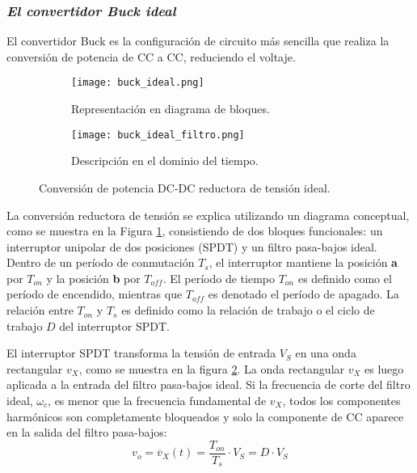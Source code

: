 \subsubsection*{\it{El convertidor Buck ideal}}
\vspace{-0.25cm}
El convertidor Buck es la configuración de circuito más sencilla que realiza la conversión de potencia de CC a CC, reduciendo el voltaje.

\begin{figure}[H]
    \centering

    \begin{subfigure}[b]{\textwidth}
        \centering
        \texttt{[image: buck\_ideal.png]}
        \vspace{-0.25cm}
        \caption{Representación en diagrama de bloques.}
        \label{fig:buck_ideal_diagrama}
    \end{subfigure}
    \begin{subfigure}[b]{\textwidth}
        \centering
        \texttt{[image: buck\_ideal\_filtro.png]}
        \vspace{-0.25cm}
        \caption{Descripción en el dominio del tiempo.}
        \label{fig:buck_ideal_filtro}
    \end{subfigure}

    \vspace{-0.25cm}
    \caption{Conversión de potencia DC-DC reductora de tensión ideal.}
    \label{fig:buck_ideal}
\end{figure}
\vspace{-0.5cm}

La conversión reductora de tensión se explica utilizando un diagrama conceptual, como se muestra en la Figura \ref{fig:buck_ideal_diagrama}, consistiendo
de dos bloques funcionales: un interruptor unipolar de dos posiciones (SPDT) y un filtro pasa-bajos ideal. Dentro de un período de conmutación $T_s$, el
interruptor mantiene la posición \textbf{a} por $T_{on}$ y la posición \textbf{b} por $T_{off}$. El período de tiempo $T_{on}$ es definido como el período de encendido,
mientras que $T_{off}$ es denotado el período de apagado. La relación entre $T_{on}$ y $T_s$ es definido como la relación de trabajo o el ciclo de trabajo $D$ del
interruptor SPDT.

El interruptor SPDT transforma la tensión de entrada $V_S$ en una onda rectangular $v_X$, como se muestra en la figura \ref{fig:buck_ideal_filtro}.
La onda rectangular $v_X$ es luego aplicada a la entrada del filtro pasa-bajos ideal. Si la frecuencia de corte del filtro ideal, $\omega_c$, es menor que la
frecuencia fundamental de $v_X$, todos los componentes harmónicos son completamente bloqueados y solo la componente de CC aparece en la salida del filtro pasa-bajos:
\begin{equation}
    v_{o} = {\overline{v}}_X(t) = \dfrac{T_{on}}{T_{s}} \cdot V_S = D \cdot V_S
    \label{eq:buck_ideal}
\end{equation}

